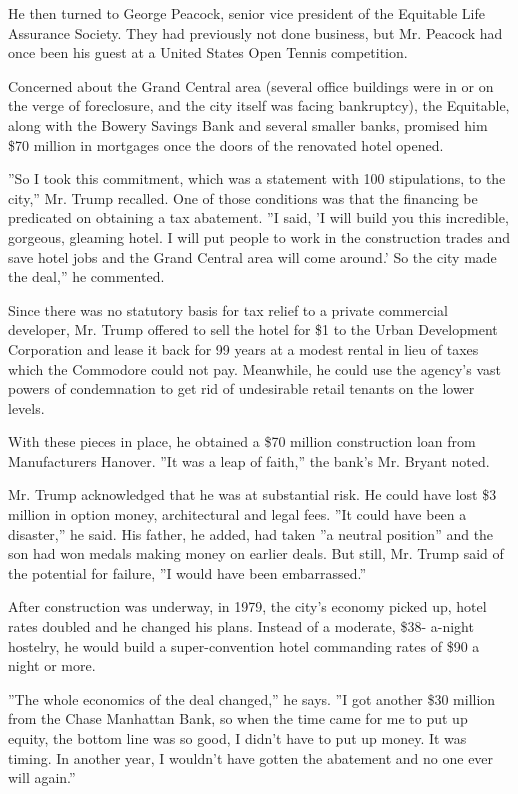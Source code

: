 He then turned to George Peacock, senior vice president of the Equitable
Life Assurance Society. They had previously not done business, but Mr.
Peacock had once been his guest at a United States Open Tennis
competition.

Concerned about the Grand Central area (several office buildings were in
or on the verge of foreclosure, and the city itself was facing
bankruptcy), the Equitable, along with the Bowery Savings Bank and
several smaller banks, promised him \$70 million in mortgages once the
doors of the renovated hotel opened.

''So I took this commitment, which was a statement with 100
stipulations, to the city,'' Mr. Trump recalled. One of those conditions
was that the financing be predicated on obtaining a tax abatement. ''I
said, 'I will build you this incredible, gorgeous, gleaming hotel. I
will put people to work in the construction trades and save hotel jobs
and the Grand Central area will come around.' So the city made the
deal,'' he commented.

Since there was no statutory basis for tax relief to a private
commercial developer, Mr. Trump offered to sell the hotel for \$1 to the
Urban Development Corporation and lease it back for 99 years at a modest
rental in lieu of taxes which the Commodore could not pay. Meanwhile, he
could use the agency's vast powers of condemnation to get rid of
undesirable retail tenants on the lower levels.

With these pieces in place, he obtained a \$70 million construction loan
from Manufacturers Hanover. ''It was a leap of faith,'' the bank's Mr.
Bryant noted.

Mr. Trump acknowledged that he was at substantial risk. He could have
lost \$3 million in option money, architectural and legal fees. ''It
could have been a disaster,'' he said. His father, he added, had taken
''a neutral position'' and the son had won medals making money on
earlier deals. But still, Mr. Trump said of the potential for failure,
''I would have been embarrassed.''

After construction was underway, in 1979, the city's economy picked up,
hotel rates doubled and he changed his plans. Instead of a moderate,
\$38- a-night hostelry, he would build a super-convention hotel
commanding rates of \$90 a night or more.

''The whole economics of the deal changed,'' he says. ''I got another
\$30 million from the Chase Manhattan Bank, so when the time came for me
to put up equity, the bottom line was so good, I didn't have to put up
money. It was timing. In another year, I wouldn't have gotten the
abatement and no one ever will again.''


